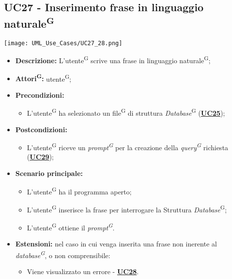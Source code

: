 \subsection{UC27 - Inserimento frase in linguaggio naturale\textsuperscript{G}}
\label{sec:UC27}
\texttt{[image: UML\_Use\_Cases/UC27\_28.png]}
\begin{itemize}
	\item \textbf{Descrizione:} L’utente\textsuperscript{G} scrive una frase in linguaggio naturale\textsuperscript{G};
	\item \textbf{Attori\textsuperscript{G}:} utente\textsuperscript{G};
	\item \textbf{Precondizioni:} 
	\begin{itemize}
		\item L’utente\textsuperscript{G} ha selezionato un file\textsuperscript{G} di struttura \textit{Database}\textsuperscript{G} (\hyperref[sec:UC25]{\textbf{UC25}});
	\end{itemize}
	\item \textbf{Postcondizioni:} 
	\begin{itemize}
		\item L’utente\textsuperscript{G} riceve un \textit{prompt\textsuperscript{G}} per la creazione della \textit{query\textsuperscript{G}} richiesta (\hyperref[sec:UC29]{\textbf{UC29}});
	\end{itemize}
	\item \textbf{Scenario principale:} 
	\begin{itemize}
		\item L’utente\textsuperscript{G} ha il programma aperto;
		\item L’utente\textsuperscript{G} inserisce la frase per interrogare la Struttura \textit{Database}\textsuperscript{G};
		\item L’utente\textsuperscript{G} ottiene il \textit{prompt\textsuperscript{G}}.
	\end{itemize}
	\item \textbf{Estensioni:} nel caso in cui venga inserita una frase non inerente al \textit{database\textsuperscript{G}}, o non comprensibile:
	\begin{itemize}
		\item Viene visualizzato un errore - \hyperref[sec:UC28]{\textbf{UC28}}.
	\end{itemize}
\end{itemize}


